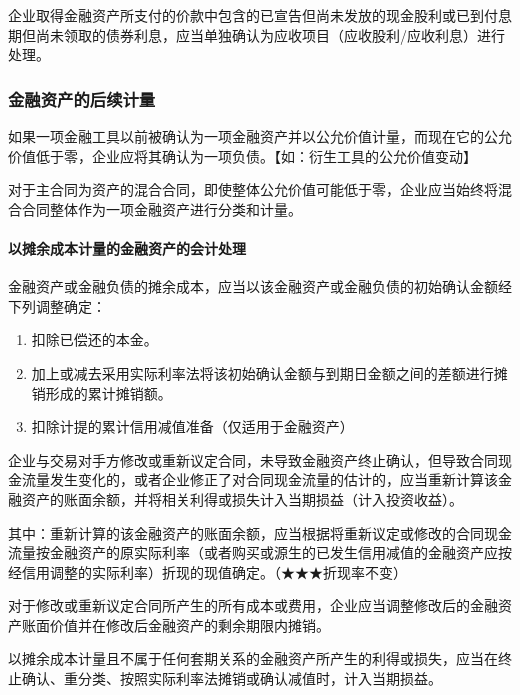 \documentclass[UTF8,12pt]{ctexart}
\numberwithin{equation}{section} %
\numberwithin{figure}{section}
\numberwithin{table}{section}
\begin{document}
	企业取得金融资产所支付的价款中包含的已宣告但尚未发放的现金股利或已到付息期但尚未领取的债券利息，应当单独确认为应收项目（应收股利/应收利息）进行处理。
	
	\subsubsection{金融资产的后续计量}
	如果一项金融工具以前被确认为一项金融资产并以公允价值计量，而现在它的公允价值低于零，企业应将其确认为一项负债。【如：衍生工具的公允价值变动】
	
	对于主合同为资产的混合合同，即使整体公允价值可能低于零，企业应当始终将混合合同整体作为一项金融资产进行分类和计量。
	
	\paragraph{以摊余成本计量的金融资产的会计处理}
	金融资产或金融负债的摊余成本，应当以该金融资产或金融负债的初始确认金额经下列调整确定：
	\begin{enumerate}
		\item 扣除已偿还的本金。
		
		\item 加上或减去采用实际利率法将该初始确认金额与到期日金额之间的差额进行摊销形成的累计摊销额。
		
		\item 扣除计提的累计信用减值准备（仅适用于金融资产）
	\end{enumerate}
	
	企业与交易对手方修改或重新议定合同，未导致金融资产终止确认，但导致合同现金流量发生变化的，或者企业修正了对合同现金流量的估计的，应当重新计算该金融资产的账面余额，并将相关利得或损失计入当期损益（计入投资收益）。

	其中：重新计算的该金融资产的账面余额，应当根据将重新议定或修改的合同现金流量按金融资产的原实际利率（或者购买或源生的已发生信用减值的金融资产应按经信用调整的实际利率）折现的现值确定。（★★★折现率不变）
		
	对于修改或重新议定合同所产生的所有成本或费用，企业应当调整修改后的金融资产账面价值并在修改后金融资产的剩余期限内摊销。

	
	以摊余成本计量且不属于任何套期关系的金融资产所产生的利得或损失，应当在终止确认、重分类、按照实际利率法摊销或确认减值时，计入当期损益。
	
\end{document}

